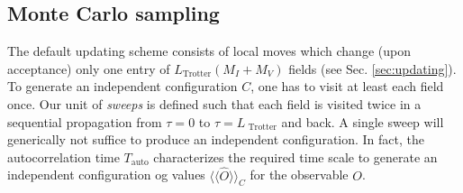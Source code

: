 %
\subsection{Monte Carlo sampling}\label{sec:sampling}
%
The default updating scheme consists of local moves which change (upon acceptance) only one  entry of $L_{\mathrm{Trotter}}(M_I+M_V)$  fields (see Sec. \ref{sec:updating}). 
To generate  an independent configuration $C$,   one has to visit at least each field  once.  Our unit of \textit{sweeps} is defined such that each field is visited twice in a sequential propagation from $\tau = 0$ to $\tau = L_{\text{ Trotter}}$  and back.  A single sweep will  generically not  suffice to produce an independent  configuration.
In fact, the autocorrelation time $T_\mathrm{auto}$ characterizes the required time scale to generate an independent configuration og values $\langle\langle\hat{O}\rangle\rangle_C$ for the observable $O$.

